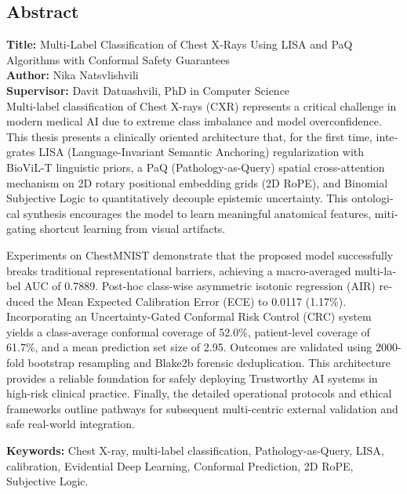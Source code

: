 \documentclass[12pt,a4paper,oneside]{report}
\begin{document}
\begin{english}
\chapter*{Abstract}

\noindent\textbf{Title:} Multi-Label Classification of Chest X-Rays Using LISA and PaQ Algorithms with Conformal Safety Guarantees \\
\noindent\textbf{Author:} Nika Natsvlishvili \\
\noindent\textbf{Supervisor:} Davit Datuashvili, PhD in Computer Science \\

\vspace{1.5em}
Multi-label classification of Chest X-rays (CXR) represents a critical challenge in modern medical AI due to extreme class imbalance and model overconfidence. This thesis presents a clinically oriented architecture that, for the first time, integrates LISA (Language-Invariant Semantic Anchoring) regularization with BioViL-T linguistic priors, a PaQ (Pathology-as-Query) spatial cross-attention mechanism on 2D rotary positional embedding grids (2D RoPE), and Binomial Subjective Logic to quantitatively decouple epistemic uncertainty. This ontological synthesis encourages the model to learn meaningful anatomical features, mitigating shortcut learning from visual artifacts.

Experiments on ChestMNIST demonstrate that the proposed model successfully breaks traditional representational barriers, achieving a macro-averaged multi-label AUC of 0.7889. Post-hoc class-wise asymmetric isotonic regression (AIR) reduced the Mean Expected Calibration Error (ECE) to 0.0117 (1.17\%). Incorporating an Uncertainty-Gated Conformal Risk Control (CRC) system yields a class-average conformal coverage of 52.0\%, patient-level coverage of 61.7\%, and a mean prediction set size of 2.95. Outcomes are validated using 2000-fold bootstrap resampling and Blake2b forensic deduplication. This architecture provides a reliable foundation for safely deploying Trustworthy AI systems in high-risk clinical practice. Finally, the detailed operational protocols and ethical frameworks outline pathways for subsequent multi-centric external validation and safe real-world integration.

\vspace{1.5em}

\noindent\textbf{Keywords:} Chest X-ray, multi-label classification, Pathology-as-Query, LISA, calibration, Evidential Deep Learning, Conformal Prediction, 2D RoPE, Subjective Logic.
\end{english}
\end{document}

